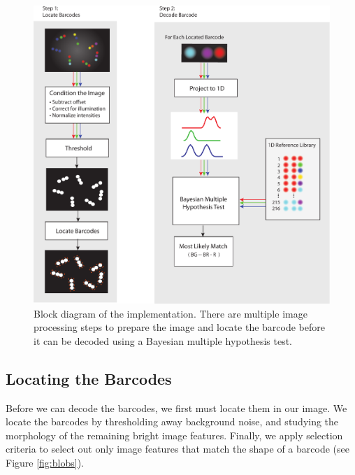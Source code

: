 \begin{figure}
\begin{center}
	\includegraphics[width=\textwidth]{figures/theoryBlockDiagram}
	\caption{Block diagram of the implementation. There are multiple image processing steps to prepare the image and locate the barcode before it can be decoded using a Bayesian multiple hypothesis test. \label{fig:theoryBlockDiagram}}
\end{center}
\end{figure}



\subsection{Locating the Barcodes} \label{sec:locatingBarcodes}
Before we can decode the barcodes, we first must locate them in our image. We locate the barcodes by thresholding away background noise, and studying the morphology of the remaining bright image features. Finally, we apply selection criteria to select out only image features that match the shape of a barcode (see Figure \ref{fig:blobs}). 

